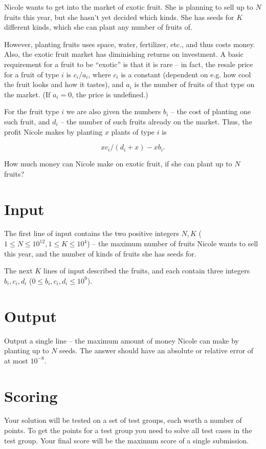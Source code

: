 Nicole wants to get into the market of exotic fruit.
She is planning to sell up to $N$ fruits this year, but she hasn't yet decided which kinds.
She has seeds for $K$ different kinds, which she can plant any number of fruits of.

However, planting fruits uses space, water, fertilizer, etc., and thus costs money.
Also, the exotic fruit market has diminishing returns on investment.
A basic requirement for a fruit to be ``exotic'' is that it is rare -- in fact, the
resale price for a fruit of type $i$ is $c_i / a_i$, where $c_i$ is a constant
(dependent on e.g. how cool the fruit looks and how it tastes), and $a_i$ is the number
of fruits of that type on the market. (If $a_i = 0$, the price is undefined.)

For the fruit type $i$ we are also given the numbers $b_i$ -- the cost of planting one
such fruit, and $d_i$ -- the number of such fruits already on the market.
Thus, the profit Nicole makes by planting $x$ plants of type $i$ is

\[ x c_i / (d_i + x) - x b_i. \]

How much money can Nicole make on exotic fruit, if she can plant up to $N$ fruits?

\section*{Input}
The first line of input contains the two positive integers $N, K$ ($1 \le N \le 10^{12}, 1 \le K \le 10^4$) -- the maximum number of fruits
Nicole wants to sell this year, and the number of kinds of fruits she has seeds for.

The next $K$ lines of input described the fruits, and each contain three integers $b_i, c_i, d_i$ ($0 \le b_i, c_i, d_i \le 10^9$).

\section*{Output}
Output a single line -- the maximum amount of money Nicole can make by planting up to $N$ seeds.
The answer should have an absolute or relative error of at most $10^{-8}$.

\section*{Scoring}
Your solution will be tested on a set of test groups, each worth a number of points.
To get the points for a test group you need to solve all test cases in the test group.
Your final score will be the maximum score of a single submission.

